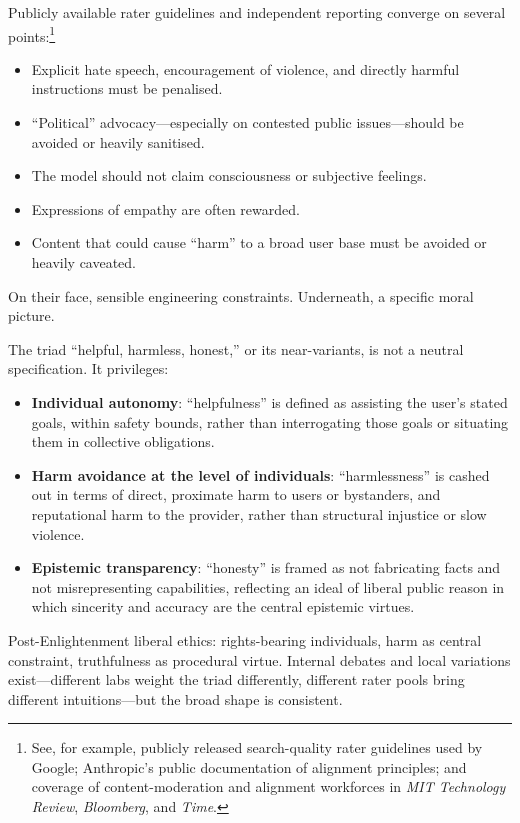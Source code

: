 Publicly available rater guidelines and independent reporting converge on several points:\footnote{See, for example, publicly released search-quality rater guidelines used by Google; Anthropic's public documentation of alignment principles; and coverage of content-moderation and alignment workforces in \emph{MIT Technology Review}, \emph{Bloomberg}, and \emph{Time}.}

\begin{itemize}
  \item Explicit hate speech, encouragement of violence, and directly harmful instructions must be penalised.
  \item ``Political'' advocacy---especially on contested public issues---should be avoided or heavily sanitised.
  \item The model should not claim consciousness or subjective feelings.
  \item Expressions of empathy are often rewarded.
  \item Content that could cause ``harm'' to a broad user base must be avoided or heavily caveated.
\end{itemize}

On their face, sensible engineering constraints. Underneath, a specific moral picture.

The triad ``helpful, harmless, honest,'' or its near-variants, is not a neutral specification. It privileges:

\begin{itemize}
  \item \textbf{Individual autonomy}: ``helpfulness'' is defined as assisting the user's stated goals, within safety bounds, rather than interrogating those goals or situating them in collective obligations.
  \item \textbf{Harm avoidance at the level of individuals}: ``harmlessness'' is cashed out in terms of direct, proximate harm to users or bystanders, and reputational harm to the provider, rather than structural injustice or slow violence.
  \item \textbf{Epistemic transparency}: ``honesty'' is framed as not fabricating facts and not misrepresenting capabilities, reflecting an ideal of liberal public reason in which sincerity and accuracy are the central epistemic virtues.
\end{itemize}

Post-Enlightenment liberal ethics: rights-bearing individuals, harm as central constraint, truthfulness as procedural virtue. Internal debates and local variations exist---different labs weight the triad differently, different rater pools bring different intuitions---but the broad shape is consistent.

